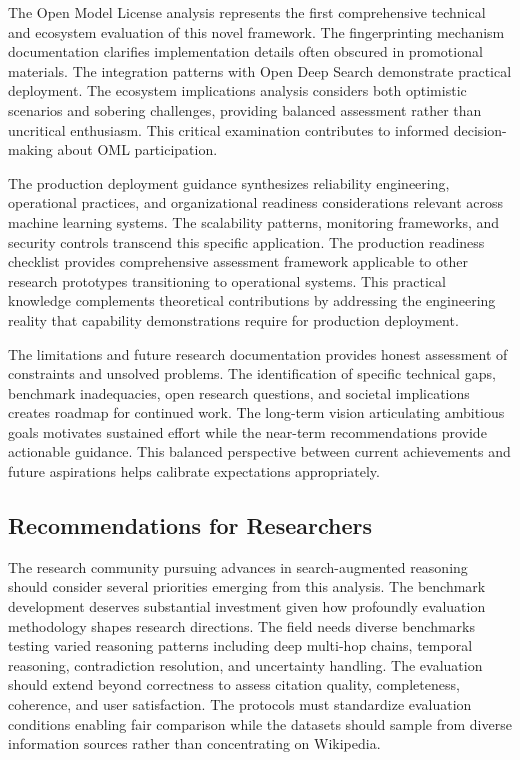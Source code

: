 The Open Model License analysis represents the first comprehensive technical and ecosystem evaluation of this novel framework. The fingerprinting mechanism documentation clarifies implementation details often obscured in promotional materials. The integration patterns with Open Deep Search demonstrate practical deployment. The ecosystem implications analysis considers both optimistic scenarios and sobering challenges, providing balanced assessment rather than uncritical enthusiasm. This critical examination contributes to informed decision-making about OML participation.

The production deployment guidance synthesizes reliability engineering, operational practices, and organizational readiness considerations relevant across machine learning systems. The scalability patterns, monitoring frameworks, and security controls transcend this specific application. The production readiness checklist provides comprehensive assessment framework applicable to other research prototypes transitioning to operational systems. This practical knowledge complements theoretical contributions by addressing the engineering reality that capability demonstrations require for production deployment.

The limitations and future research documentation provides honest assessment of constraints and unsolved problems. The identification of specific technical gaps, benchmark inadequacies, open research questions, and societal implications creates roadmap for continued work. The long-term vision articulating ambitious goals motivates sustained effort while the near-term recommendations provide actionable guidance. This balanced perspective between current achievements and future aspirations helps calibrate expectations appropriately.

\subsection{Recommendations for Researchers}

The research community pursuing advances in search-augmented reasoning should consider several priorities emerging from this analysis. The benchmark development deserves substantial investment given how profoundly evaluation methodology shapes research directions. The field needs diverse benchmarks testing varied reasoning patterns including deep multi-hop chains, temporal reasoning, contradiction resolution, and uncertainty handling. The evaluation should extend beyond correctness to assess citation quality, completeness, coherence, and user satisfaction. The protocols must standardize evaluation conditions enabling fair comparison while the datasets should sample from diverse information sources rather than concentrating on Wikipedia.


